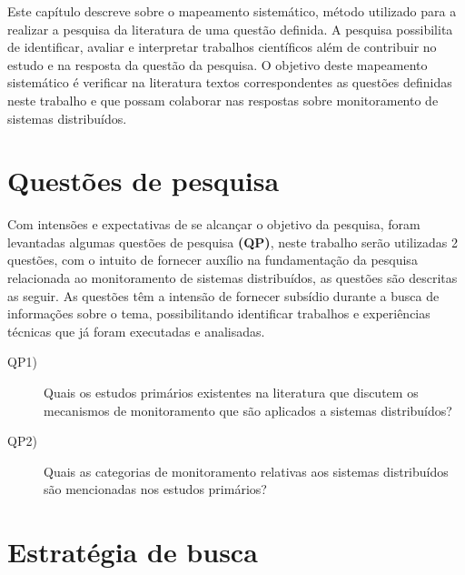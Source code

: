 \label{mapeamento_sistematico}

Este capítulo descreve sobre o mapeamento sistemático, método utilizado para a realizar a pesquisa da literatura de uma questão definida. A pesquisa possibilita de identificar, avaliar e interpretar trabalhos científicos além de contribuir no estudo e na resposta da questão da pesquisa\cite{kitchenham2007guidelines,petticrew2008systematic,de2018mapeamento}. O objetivo deste mapeamento sistemático é verificar na literatura textos correspondentes as questões definidas neste trabalho e que possam colaborar nas respostas sobre monitoramento de sistemas distribuídos.


\section{Questões de pesquisa}

Com intensões e expectativas de se alcançar o objetivo da pesquisa, foram levantadas algumas questões de pesquisa \textbf{(QP)}, neste trabalho serão utilizadas 2 questões, com o intuito de fornecer auxílio na fundamentação da pesquisa relacionada ao monitoramento de sistemas distribuídos, as questões são descritas as seguir. As questões têm a intensão de fornecer subsídio durante a busca de informações sobre o tema, possibilitando identificar trabalhos e experiências técnicas que já foram executadas e analisadas\cite{feltrim2004abordagem}.

\begin{description}
\item[QP1)] Quais os estudos primários existentes na literatura que discutem os mecanismos de monitoramento 
que são aplicados a sistemas distribuídos?
\item[QP2)] Quais as categorias de monitoramento relativas aos sistemas distribuídos são mencionadas nos estudos primários?
\end{description}


\section{Estratégia de busca}

